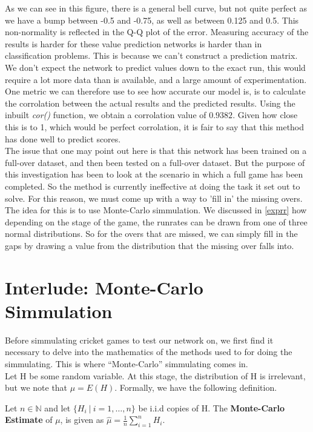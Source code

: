 As we can see in this figure, there is a general bell curve, but not quite perfect as we have a bump between -0.5 and -0.75, as well as between 0.125 and 0.5. This 
non-normality is reflected in the Q-Q plot of the error. Measuring accuracy of the results is harder for these value prediction networks is harder than in classification 
problems. This is because we can't construct a prediction matrix. We don't expect the network to predict values down to the exact run, this would require a lot more 
data than is available, and a large amount of experimentation. One metric we can therefore use to see how accurate our model is, is to calculate 
the corrolation between the actual results and the predicted results. Using the inbuilt \textit{cor()} function, we obtain a corrolation value of 
$0.9382$. Given how close this is to 1, which would be perfect corrolation, it is fair to say that this method has done well to predict scores. \\

The issue that one may point out here is that this network has been trained on a full-over dataset, and then been tested on a full-over dataset. But the purpose of this 
investigation has been to look at the scenario in which a full game has been completed. So the method is currently ineffective at doing the task it set out to solve. For this reason,
we must come up with a way to 'fill in' the missing overs. The idea for this is to use Monte-Carlo simmulation. We discussed in \ref{exprr} how depending on the stage of the game,
the runrates can be drawn from one of three normal distributions. So for the overs that are missed, we can simply fill in the gaps by drawing a value from the distribution that the missing over falls 
into. 

\section{Interlude: Monte-Carlo Simmulation}
\label{mcsim}
Before simmulating cricket games to test our network on, we first find it necessary to delve into the mathematics of the methods used to for doing the simmulating. This is where
``Monte-Carlo'' simmulating comes in. \\
Let H be some random variable. At this stage, the distribution of H is irrelevant, but we note that $\mu = E(H)$. Formally, we have the following definition.

\begin{definition}
    Let $n \in \mathbb{N}$ and let $\{H_i \ | \ i =1,\ldots,n\}$ be i.i.d copies of H. The \textbf{Monte-Carlo Estimate} of $\mu$, is given as $\hat{\mu}=\frac{1}{n}\sum_{i=1}^n H_i$.  
\end{definition}


